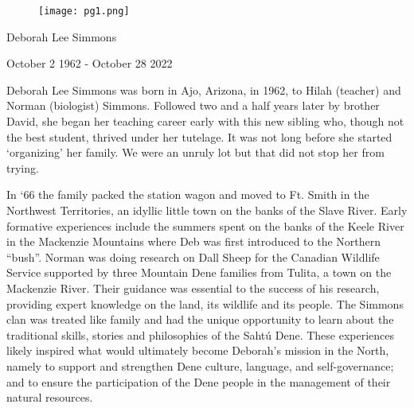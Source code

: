 \documentclass[12pt]{extarticle}
\newcommand\AtPageUpperRight[1]{\AtPageUpperLeft{%
 \put(\LenToUnit{\paperwidth},\LenToUnit{0\paperheight}){#1}%
 }}%
\newcommand\AtPageLowerRight[1]{\AtPageLowerLeft{%
 \put(\LenToUnit{\paperwidth},\LenToUnit{0\paperheight}){#1}%
 }}%
\begin{document}
\vspace*{\fill}

\begin{figure}[h!]
\centering
\texttt{[image: pg1.png]}
\end{figure}

\begin{center}
\end{center}

{\centering \huge Deborah Lee Simmons\par}
{\centering \Large October 2 1962 - October 28 2022\par} 

\vspace*{\fill}

\AddToShipoutPictureBG*{%
   \AtPageUpperLeft{\put(0,-21){\pgfornament[width=1.5cm]{61}}}
   \AtPageUpperRight{\put(-42,-21){\pgfornament[width=1.5cm,symmetry=v]{61}}}
   \AtPageLowerLeft{\put(0,21){\pgfornament[width=1.5cm,symmetry=h]{61}}}
   \AtPageLowerRight{\put(-42,21){\pgfornament[width=1.5cm,symmetry=c]{61}}}
}


\newpage
{}
\vspace*{\fill}
Deborah Lee Simmons was born in Ajo, Arizona, in 1962, to Hilah (teacher) 
and Norman (biologist) Simmons. Followed two and a half years later by
brother David, she began her teaching career early with this new sibling
who, though not the best student, thrived under her tutelage. It was not
long before she started `organizing' her family. We were an unruly lot
but that did not stop her from trying.

In `66 the family packed the station wagon and moved to Ft. Smith in the
Northwest Territories, an idyllic little town on the banks of the Slave
River. Early formative experiences include the summers spent on the
banks of the Keele River in the Mackenzie Mountains where Deb was first
introduced to the Northern ``bush''. Norman was doing research on Dall
Sheep for the Canadian Wildlife Service supported by three Mountain Dene
families from Tulita, a town on the Mackenzie River. Their guidance was
essential to the success of his research, providing expert knowledge on
the land, its wildlife and its people. The Simmons clan was treated like
family and had the unique opportunity to learn about the traditional
skills, stories and philosophies of the Sahtú Dene. These experiences
likely inspired what would ultimately become Deborah's mission in the
North, namely to support and strengthen Dene culture, language, and
self-governance; and to ensure the participation of the Dene people in
the management of their natural resources.
\end{document}
